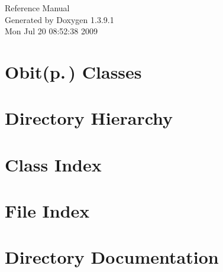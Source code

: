 \documentclass[letterpaper]{book}
\begin{document}
\begin{titlepage}
\vspace*{7cm}
\begin{center}
{\Large Reference Manual}\\
\vspace*{1cm}
{\large Generated by Doxygen 1.3.9.1}\\
\vspace*{0.5cm}
{\small Mon Jul 20 08:52:38 2009}\\
\end{center}
\end{titlepage}
\clearemptydoublepage
{}
\tableofcontents
\clearemptydoublepage
{}
\chapter{{\bf Obit}{\rm (p.\,\pageref{structObit})} Classes }
\label{index}
\chapter{Directory Hierarchy}

\chapter{Class Index}

\chapter{File Index}

\chapter{Directory Documentation}


\end{document}
